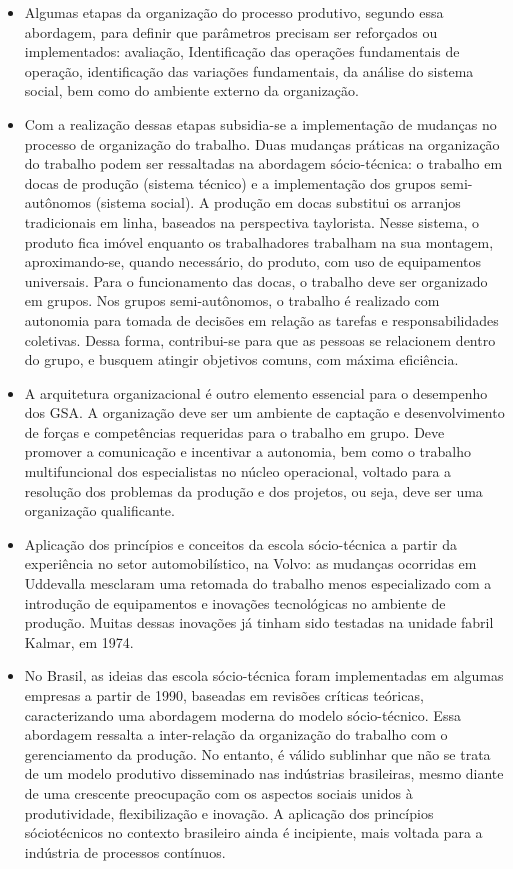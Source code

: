 \documentclass{article}
\begin{document}
\begin{itemize}
    \item Algumas etapas da organização do processo produtivo, segundo essa abordagem, para definir que parâmetros precisam ser reforçados ou implementados: avaliação, Identificação das operações fundamentais de operação, identificação das variações fundamentais, da análise do sistema social, bem como do ambiente externo da organização.
    \item Com a realização dessas etapas subsidia-se a implementação de mudanças no processo de organização do trabalho. Duas mudanças práticas na organização do trabalho podem ser ressaltadas na abordagem sócio-técnica: o trabalho em docas de produção (sistema técnico) e a implementação dos grupos semi-autônomos (sistema social). A produção em docas substitui os arranjos tradicionais em linha, baseados na perspectiva taylorista. Nesse sistema, o produto fica imóvel enquanto os trabalhadores trabalham na sua montagem, aproximando-se, quando necessário, do produto, com uso de equipamentos universais. Para o funcionamento das docas, o trabalho deve ser organizado em grupos. Nos grupos semi-autônomos, o trabalho é realizado com autonomia para tomada de decisões em relação as tarefas e responsabilidades coletivas. Dessa forma, contribui-se para que as pessoas se relacionem dentro do grupo, e busquem atingir objetivos comuns, com máxima eficiência.
    \item A arquitetura organizacional é outro elemento essencial para o desempenho dos GSA. A organização deve ser um ambiente de captação e desenvolvimento de forças e competências requeridas para o trabalho em grupo. Deve promover a comunicação e incentivar a autonomia, bem como o trabalho multifuncional dos especialistas no núcleo operacional, voltado para a resolução dos problemas da produção e dos projetos, ou seja, deve ser uma organização qualificante.
    \item Aplicação dos princípios e conceitos da escola sócio-técnica a partir da experiência no setor automobilístico, na Volvo: as mudanças ocorridas em Uddevalla mesclaram uma retomada do trabalho menos especializado com a introdução de equipamentos e inovações tecnológicas no ambiente de produção. Muitas dessas inovações já tinham sido testadas na unidade fabril Kalmar, em 1974.
    \item No Brasil, as ideias das escola sócio-técnica foram implementadas em algumas empresas a partir de 1990, baseadas em revisões críticas teóricas, caracterizando uma abordagem moderna do modelo sócio-técnico. Essa abordagem ressalta a inter-relação da organização do trabalho com o gerenciamento da produção. No entanto, é válido sublinhar que não se trata de um modelo produtivo disseminado nas indústrias brasileiras, mesmo diante de uma crescente preocupação com os aspectos sociais unidos à produtividade, flexibilização e inovação. A aplicação dos princípios sóciotécnicos no contexto brasileiro ainda é incipiente, mais voltada para a indústria de processos contínuos.

\end{itemize}
\end{document}
